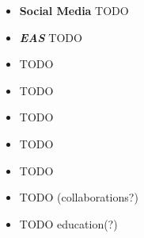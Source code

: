 \documentclass[a4]{scrartcl}
\begin{document}
	\begin{itemize}
		
		
		\item \textbf{Social Media} TODO
		
		
		
		
		
		\item \textit{\textbf{EAS}} TODO
		
		
		
		\item TODO
		
		
		\item  TODO
		
		
		
		\item 	TODO
		
		
		
		
		\item 	TODO
		
		
		\item TODO
		
		
		\item TODO (collaborations?)
		
		
		\item TODO education(?)
		
		
		
	\end{itemize}
	
\end{document}
